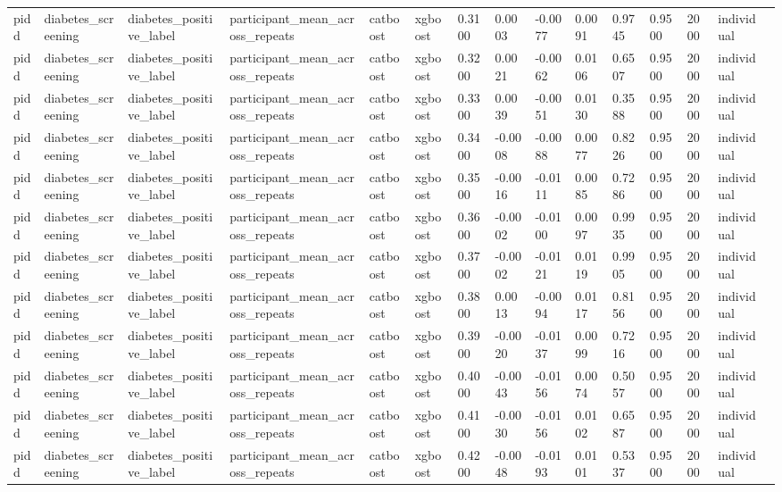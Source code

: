 \begin{tabular}{lllllllllllllll}
pidd & diabetes\_screening & diabetes\_positive\_label & participant\_mean\_across\_repeats & catboost & xgboost & 0.3100 & 0.0003 & -0.0077 & 0.0091 & 0.9745 & 0.9500 & 2000 & individual &  \\
pidd & diabetes\_screening & diabetes\_positive\_label & participant\_mean\_across\_repeats & catboost & xgboost & 0.3200 & 0.0021 & -0.0062 & 0.0106 & 0.6507 & 0.9500 & 2000 & individual &  \\
pidd & diabetes\_screening & diabetes\_positive\_label & participant\_mean\_across\_repeats & catboost & xgboost & 0.3300 & 0.0039 & -0.0051 & 0.0130 & 0.3588 & 0.9500 & 2000 & individual &  \\
pidd & diabetes\_screening & diabetes\_positive\_label & participant\_mean\_across\_repeats & catboost & xgboost & 0.3400 & -0.0008 & -0.0088 & 0.0077 & 0.8226 & 0.9500 & 2000 & individual &  \\
pidd & diabetes\_screening & diabetes\_positive\_label & participant\_mean\_across\_repeats & catboost & xgboost & 0.3500 & -0.0016 & -0.0111 & 0.0085 & 0.7286 & 0.9500 & 2000 & individual &  \\
pidd & diabetes\_screening & diabetes\_positive\_label & participant\_mean\_across\_repeats & catboost & xgboost & 0.3600 & -0.0002 & -0.0100 & 0.0097 & 0.9935 & 0.9500 & 2000 & individual &  \\
pidd & diabetes\_screening & diabetes\_positive\_label & participant\_mean\_across\_repeats & catboost & xgboost & 0.3700 & -0.0002 & -0.0121 & 0.0119 & 0.9905 & 0.9500 & 2000 & individual &  \\
pidd & diabetes\_screening & diabetes\_positive\_label & participant\_mean\_across\_repeats & catboost & xgboost & 0.3800 & 0.0013 & -0.0094 & 0.0117 & 0.8156 & 0.9500 & 2000 & individual &  \\
pidd & diabetes\_screening & diabetes\_positive\_label & participant\_mean\_across\_repeats & catboost & xgboost & 0.3900 & -0.0020 & -0.0137 & 0.0099 & 0.7216 & 0.9500 & 2000 & individual &  \\
pidd & diabetes\_screening & diabetes\_positive\_label & participant\_mean\_across\_repeats & catboost & xgboost & 0.4000 & -0.0043 & -0.0156 & 0.0074 & 0.5057 & 0.9500 & 2000 & individual &  \\
pidd & diabetes\_screening & diabetes\_positive\_label & participant\_mean\_across\_repeats & catboost & xgboost & 0.4100 & -0.0030 & -0.0156 & 0.0102 & 0.6587 & 0.9500 & 2000 & individual &  \\
pidd & diabetes\_screening & diabetes\_positive\_label & participant\_mean\_across\_repeats & catboost & xgboost & 0.4200 & -0.0048 & -0.0193 & 0.0101 & 0.5337 & 0.9500 & 2000 & individual &  \\

\end{tabular}
